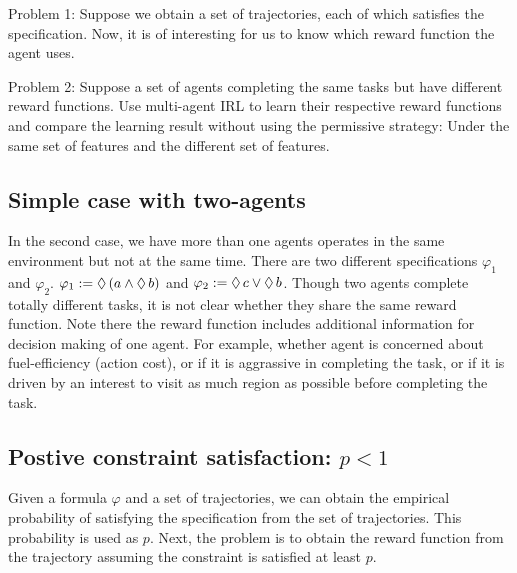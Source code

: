 \documentclass{article}[11pt]
\begin{document}
Problem 1: Suppose we obtain a set of trajectories, each of which satisfies the
specification. Now, it is of interesting for us to know which reward
function the agent uses.

Problem 2: Suppose a set of agents completing the same tasks but have
different reward functions. Use multi-agent IRL to learn their
respective reward functions and compare the learning result without
using the permissive strategy: Under the same set of features and the
different set of features.

\subsection{Simple case with two-agents}
In the second case, we have more than one agents operates in the same
environment but not at the same time. There are two different
specifications $\varphi_1$ and $\varphi_2$.
$\varphi_1 := \Diamond \, (a \land \Diamond \, b)$ and
$\varphi_2 := \Diamond \, c \lor \Diamond \, b$. Though two
agents complete totally different tasks, it is not clear whether they
share the same reward function. Note there the reward function
includes additional information for decision making of one agent. For
example, whether agent is concerned about fuel-efficiency (action
cost), or if it is aggrassive in completing the task, or if it is
driven by an interest to visit as much region as possible before
completing the task. 


\subsection{Postive constraint satisfaction: $p < 1$}
Given a formula $\varphi$ and a set of trajectories, we can obtain the
empirical probability of satisfying the specification from the set of
trajectories. This probability is used as $p$. Next, the problem is to
obtain the reward function from the trajectory assuming the constraint
is satisfied at least $p$.
\end{document}
